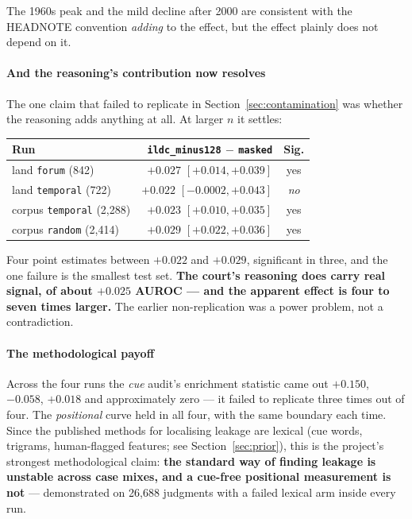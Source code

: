 \documentclass[12pt,a4paper]{article}
\newcommand{\code}[1]{\texttt{\small #1}}
\begin{document}
The 1960s peak and the mild decline after 2000 are consistent with the HEADNOTE convention
\emph{adding} to the effect, but the effect plainly does not depend on it.

\paragraph{And the reasoning's contribution now resolves} The one claim that failed to replicate in
Section~\ref{sec:contamination} was whether the reasoning adds anything at all. At larger $n$ it
settles:

\begin{center}
\begin{tabular}{@{}lrc@{}}
\toprule
\textbf{Run} & \code{ildc\_minus128} $-$ \code{masked} & \textbf{Sig.} \\
\midrule
land \code{forum} (842)      & $+0.027$ $[+0.014, +0.039]$ & yes \\
land \code{temporal} (722)   & $+0.022$ $[-0.0002, +0.043]$ & \emph{no} \\
corpus \code{temporal} (2,288) & $+0.023$ $[+0.010, +0.035]$ & yes \\
corpus \code{random} (2,414)   & $+0.029$ $[+0.022, +0.036]$ & yes \\
\bottomrule
\end{tabular}
\end{center}

Four point estimates between $+0.022$ and $+0.029$, significant in three, and the one failure is the
smallest test set. \textbf{The court's reasoning does carry real signal, of about $+0.025$ AUROC ---
and the apparent effect is four to seven times larger.} The earlier non-replication was a power
problem, not a contradiction.

\paragraph{The methodological payoff} Across the four runs the \emph{cue} audit's enrichment
statistic came out $+0.150$, $-0.058$, $+0.018$ and approximately zero --- it failed to replicate
three times out of four. The \emph{positional} curve held in all four, with the same boundary each
time. Since the published methods for localising leakage are lexical (cue words, trigrams,
human-flagged features; see Section~\ref{sec:prior}), this is the project's strongest
methodological claim: \textbf{the standard way of finding leakage is unstable across case mixes, and
a cue-free positional measurement is not} --- demonstrated on 26,688 judgments with a failed lexical
arm inside every run.
\end{document}
